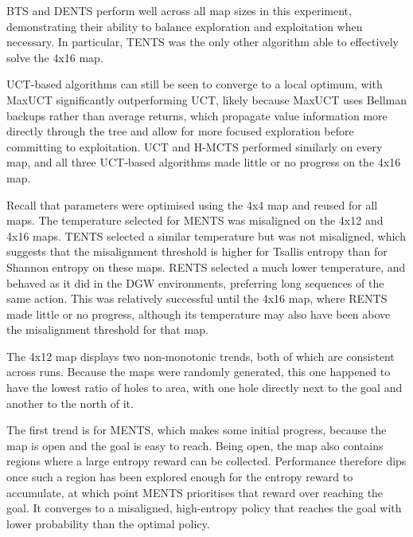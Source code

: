     BTS and DENTS perform well across all map sizes in this experiment, demonstrating their ability to balance exploration and exploitation when necessary. In particular, TENTS was the only other algorithm able to effectively solve the 4x16 map.

    UCT-based algorithms can still be seen to converge to a local optimum, with MaxUCT significantly outperforming UCT, likely because MaxUCT uses Bellman backups rather than average returns, which propagate value information more directly through the tree and allow for more focused exploration before committing to exploitation. UCT and H-MCTS performed similarly on every map, and all three UCT-based algorithms made little or no progress on the 4x16 map.

    Recall that parameters were optimised using the 4x4 map and reused for all maps. The temperature selected for MENTS was misaligned on the 4x12 and 4x16 maps. TENTS selected a similar temperature but was not misaligned, which suggests that the misalignment threshold is higher for Tsallis entropy than for Shannon entropy on these maps. RENTS selected a much lower temperature, and behaved as it did in the DGW environments, preferring long sequences of the same action. This was relatively successful until the 4x16 map, where RENTS made little or no progress, although its temperature may also have been above the misalignment threshold for that map.

    The 4x12 map displays two non-monotonic trends, both of which are consistent across runs. Because the maps were randomly generated, this one happened to have the lowest ratio of holes to area, with one hole directly next to the goal and another to the north of it.

    The first trend is for MENTS, which makes some initial progress, because the map is open and the goal is easy to reach. Being open, the map also contains regions where a large entropy reward can be collected. Performance therefore dips once such a region has been explored enough for the entropy reward to accumulate, at which point MENTS prioritises that reward over reaching the goal. It converges to a misaligned, high-entropy policy that reaches the goal with lower probability than the optimal policy.

